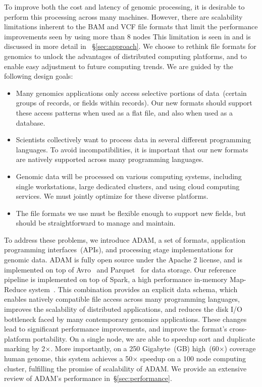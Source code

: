\documentclass{bioinfo}
\begin{document}
To improve both the cost and latency of genomic processing, it is desirable to perform this processing across many machines. However, there are scalability limitations inherent
to the BAM and VCF file formats that limit the performance improvements seen by using more than 8 nodes This limitation is seen in \citet{niemenmaa12} and is discussed in
more detail in ~\S\ref{sec:approach}. We choose to rethink file formats for genomics to unlock the advantages of distributed computing platforms, and to enable easy adjustment
to future computing trends. We are guided by the following design goals:

\begin{itemize}
\item Many genomics applications only access selective portions of data~(certain groups of records, or fields within records). Our new formats should support these access
patterns when used as a flat file, and also when used as a database.
\item Scientists collectively want to process data in several different programming languages. To avoid incompatibilities, it is important that our new formats are natively
supported across many programming languages.
\item Genomic data will be processed on various computing systems, including single workstations, large dedicated clusters,
and using cloud computing services. We must jointly optimize for these diverse platforms.
\item The file formats we use must be flexible enough to support new fields, but should be straightforward to manage and maintain.
\end{itemize}

To address these problems, we introduce ADAM, a set of formats, application programming interfaces~(APIs), and processing stage implementations for genomic data.
ADAM is fully open source under the Apache 2 license, and is implemented on top of Avro~\citep{avro} and Parquet~\citep{parquet} for data storage. Our reference pipeline
is implemented on top of Spark, a high performance in-memory Map-Reduce system~\citep{zaharia10}. This combination provides an explicit data schema, which enables
natively compatible file access across many programming languages, improves the scalability of distributed applications, and reduces the disk I/O bottleneck faced by many
contemporary genomics applications. These changes lead to significant performance improvements, and improve the format's cross-platform portability. On a single
node, we are able to speedup sort and duplicate marking by 2$\times$. More importantly, on a 250 Gigabyte~(GB) high~(60$\times$) coverage
human genome, this system achieves a 50$\times$ speedup on a 100 node computing cluster, fulfilling the promise of scalability of ADAM.
We provide an extensive review of ADAM's performance in~\S\ref{sec:performance}.
\end{document}
